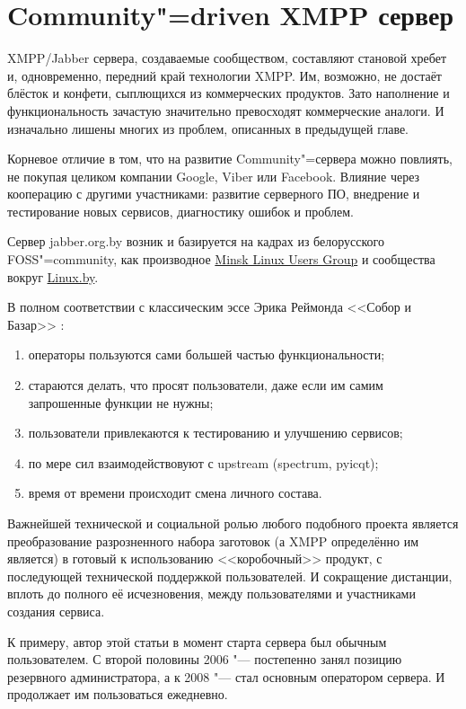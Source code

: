 \documentclass[10pt, a5paper]{article}
\begin{document}
\section*{Community"=driven XMPP сервер}

XMPP/Jabber сервера, создаваемые сообществом, составляют становой хребет и, одновременно, передний край технологии XMPP. Им, возможно, не достаёт блёсток и конфети, сыплющихся из коммерческих продуктов. Зато наполнение и функциональность зачастую значительно превосходят коммерческие аналоги. И изначально лишены многих из проблем, описанных в предыдущей главе.

Корневое отличие в том, что на развитие Community"=сервера можно повлиять, не покупая целиком компании Google, Viber или Facebook. Влияние через кооперацию с другими участниками: развитие серверного ПО, внедрение и тестирование новых сервисов, диагностику ошибок и проблем.

Сервер jabber.org.by возник и базируется на кадрах из белорусского FOSS"=community, как производное \href{http://mlug.linux.by}{Minsk Linux Users Group}  и сообщества вокруг \href{http://forum.linux.by}{Linux.by}.

В полном соответствии с классическим эссе Эрика Реймонда <<Собор и Базар>> \cite{Mendoza2}:
\begin{enumerate}
  \item операторы пользуются сами большей частью функциональности;
  \item стараются делать, что просят пользователи, даже если им самим запрошенные функции не нужны;
  \item пользователи привлекаются к тестированию и улучшению  сервисов;
  \item по мере сил взаимодействовуют с upstream (spectrum, pyicqt);
  \item время от времени происходит смена личного состава.
\end{enumerate}

Важнейшей технической и социальной ролью любого подобного проекта является преобразование разрозненного набора заготовок (а XMPP определённо им является) в готовый к использованию <<коробочный>> продукт, с последующей технической поддержкой пользователей. И сокращение дистанции, вплоть до полного её исчезновения, между пользователями и участниками создания сервиса.

К примеру, автор этой статьи в момент старта сервера был обычным пользователем. С второй половины 2006 "--- постепенно занял позицию резервного администратора, а к 2008 "--- стал основным оператором сервера. И продолжает им пользоваться ежедневно.
\end{document}
